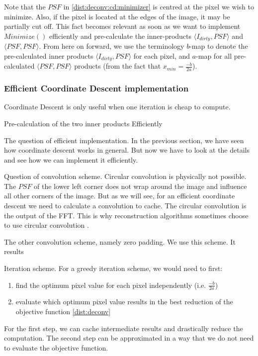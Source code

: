 Note that the $PSF$ in \eqref{dist:deconv:cd:minimizer} is centred at the pixel we wish to minimize. Also, if the pixel is located at the edges of the image, it may be partially cut off. This fact becomes relevant as soon as we want to implement $Minimize()$ efficiently and pre-calculate the inner-products $\langle I_{dirty},PSF\rangle$ and $\langle PSF, PSF \rangle$. From here on forward, we use the terminology $b$-map to denote the pre-calculated inner products $\langle I_{dirty},PSF\rangle$ for each pixel, and $a$-map for all pre-calculated $\langle PSF, PSF \rangle$ products (from the fact that $x_{min} = \frac{-b}{2a}$). 


\subsubsection{Efficient Coordinate Descent implementation}\label{dist:deconv:efficient}
Coordinate Descent is only useful when one iteration is cheap to compute.

Pre-calculation of the two inner products
Efficiently



The question of efficient implementation. In the previous section, we have seen how coordinate descent works in general. But now we have to look at the details and see how we can implement it efficiently.

Question of convolution scheme. 
Circular convolution is physically not possible. The $PSF$ of the lower left corner does not wrap around the image and influence all other corners of the image. But as we will see, for an efficient coordinate descent we need to calculate a convolution to cache. The circular convolution is the output of the FFT. This is why reconstruction algorithms sometimes choose to use circular convolution \cite{ferrari2014distributed}.

The other convolution scheme, namely zero padding. We use this scheme. It results 

Iteration scheme. For a greedy iteration scheme, we would need to first:
\begin{enumerate}
	\item find the optimum pixel value for each pixel independently (i.e. $\frac{-b}{2a}$)
	\item evaluate which optimum pixel value results in the best reduction of the objective function \eqref{dist:deconv}
\end{enumerate}

For the first step, we can cache intermediate results and drastically reduce the computation. The second step can be approximated in a way that we do not need to evaluate the objective function.

